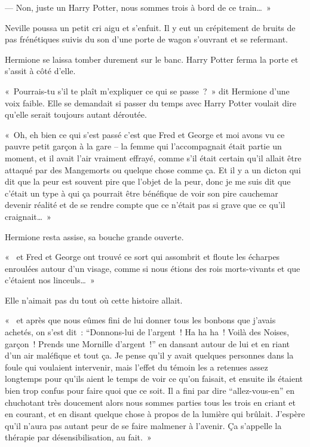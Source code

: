 --- Non, juste un Harry Potter, nous sommes trois à bord de ce train…~»

Neville poussa un petit cri aigu et s'enfuit. Il y eut un crépitement de bruits de pas frénétiques suivis du son d'une porte de wagon s'ouvrant et se refermant.

Hermione se laissa tomber durement sur le banc. Harry Potter ferma la porte et s'assit à côté d'elle.

«~Pourrais-tu s'il te plaît m'expliquer ce qui se passe~?~» dit Hermione d'une voix faible. Elle se demandait si passer du temps avec Harry Potter voulait dire qu'elle serait toujours autant déroutée.

«~Oh, eh bien ce qui s'est passé c'est que Fred et George et moi avons vu ce pauvre petit garçon à la gare -- la femme qui l'accompagnait était partie un moment, et il avait l'air vraiment effrayé, comme s'il était certain qu'il allait être attaqué par des Mangemorts ou quelque chose comme ça. Et il y a un dicton qui dit que la peur est souvent pire que l'objet de la peur, donc je me suis dit que c'était un type à qui ça pourrait être bénéfique de voir son pire cauchemar devenir réalité et de se rendre compte que ce n'était pas si grave que ce qu'il craignait…~»

Hermione resta assise, sa bouche grande ouverte.

«~ et Fred et George ont trouvé ce sort qui assombrit et floute les écharpes enroulées autour d'un visage, comme si nous étions des rois morts-vivants et que c'étaient nos linceuls…~»

Elle n'aimait pas du tout où cette histoire allait.

«~ et après que nous eûmes fini de lui donner tous les bonbons que j'avais achetés, on s'est dit~: “Donnons-lui de l'argent~! Ha ha ha~! Voilà des Noises, garçon~! Prends une Mornille d'argent~!” en dansant autour de lui et en riant d'un air maléfique et tout ça. Je pense qu'il y avait quelques personnes dans la foule qui voulaient intervenir, mais l'effet du témoin\footnotemark{} les a retenues assez longtemps pour qu'ils aient le temps de voir ce qu'on faisait, et ensuite ils étaient bien trop confus pour faire quoi que ce soit. Il a fini par dire “allez-vous-en” en chuchotant très doucement alors nous sommes parties tous les trois en criant et en courant, et en disant quelque chose à propos de la lumière qui brûlait. J'espère qu'il n'aura pas autant peur de se faire malmener à l'avenir. Ça s'appelle la thérapie par désensibilisation, au fait.~»

